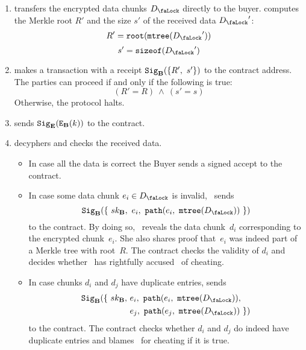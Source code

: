 \begin{enumerate}
\item {} transfers the encrypted data chunks $\Lock{D}$ directly to the buyer.  computes the Merkle root $R'$ and the size $s'$ of the received data $\Lock{D}'$:
\begin{equation}
R' = \Root(\MerkleTree(\Lock{D}'))
\end{equation}
\begin{equation}
s' = \SizeOf(\Lock{D}')
\end{equation}
\item \label{step:buyers-receipt}  makes a transaction with a receipt $\mathtt{Sig}_{\mathbf{B}}(\{R',\ s'\})$ to the contract address. The parties can proceed if and only if the following is true:
\begin{equation}
(R' = R)\ \land\ (s' = s)
\end{equation}
Otherwise, the protocol halts.
\item \label{step:secret-sharing}  sends $\mathtt{Sig}_{\mathbf{E}}(\mathtt{E}_{\mathbf{B}}(k))$ to the contract.
\item \label{step:arbitrage}  decyphers and checks the received data.

  \begin{itemize}
    \item In case all the data is correct the Buyer sends a signed accept to the contract.
    \item In case some data chunk $e_i \in \Lock{D}$ is invalid, ~sends
    \begin{equation*}
      \Sign_\Party{B}(\{\ \SecretKey{B},\ e_i,\ \Path(e_i,\ \MerkleTree(\Lock{D}))\ \})
    \end{equation*}
    to the contract. By doing so, ~reveals the data chunk~$d_i$ corresponding to the encrypted chunk~$e_i$. She also shares proof that~$e_i$ was indeed part of a  Merkle tree with root~$R$. The contract checks the validity of $d_i$ and decides whether ~has rightfully accused~ of cheating.

    \item In case chunks $d_i$ and $d_j$ have duplicate entries,  sends
    \begin{equation*}
      \begin{split}
        \Sign_\Party{B}(\{\ \SecretKey{B}, & \ e_i,\ \Path(e_i,\ \MerkleTree(\Lock{D})),\\
         & \ e_j,\ \Path(e_j,\ \MerkleTree(\Lock{D}))\ \})
      \end{split}
    \end{equation*}
    to the contract. The contract checks whether $d_i$ and $d_j$ do indeed have duplicate entries and blames~ for cheating if it is true.
  \end{itemize}
\end{enumerate}

